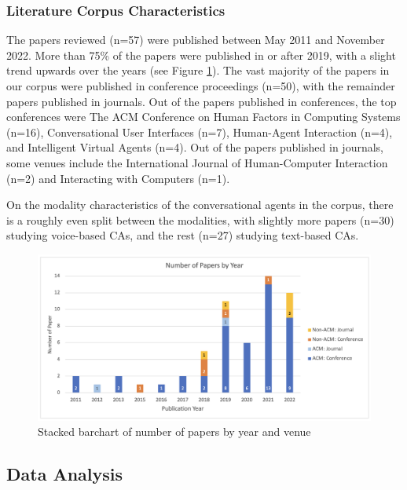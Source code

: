\documentclass[sigconf,screen,review, anonymous]{acmart}
\begin{document}
\subsubsection*{Literature Corpus Characteristics}

The papers reviewed (n=57) were published between May 2011 and November 2022. More than 75\% of the papers were published in or after 2019, with a slight trend upwards over the years (see Figure \ref{fig:paper}). The vast majority of the papers in our corpus were published in conference proceedings (n=50), with the remainder papers published in journals. Out of the papers published in conferences, the top conferences were The ACM Conference on Human Factors in Computing Systems (n=16), Conversational User Interfaces (n=7), Human-Agent Interaction (n=4), and Intelligent Virtual Agents (n=4). Out of the papers published in journals, some venues include the International Journal of Human-Computer Interaction (n=2) and Interacting with Computers (n=1).

On the modality characteristics of the conversational agents in the corpus, there is a roughly even split between the modalities, with slightly more papers (n=30) studying voice-based CAs, and the rest (n=27) studying text-based CAs.

\begin{figure}[h]
  \centering
  \includegraphics[width=\textwidth]{fig-paper.png}
  \caption{Stacked barchart of number of papers by year and venue}
  \label{fig:paper}
\end{figure}

\subsection{Data Analysis}
\end{document}
